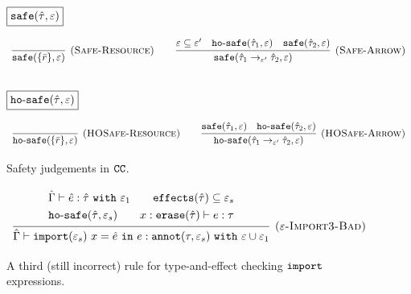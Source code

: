 \begin{figure}
\vspace*{-5mm}
\noindent
$\fbox{$\mathtt{safe}(\hat \tau, \varepsilon)$}$

\vspace{-2mm}
\[
\begin{array}{c}
\infer[\textsc{(Safe-Resource)}]
	{ \kwa{safe}(\{ \bar r \}, \varepsilon) }
	{} 
\hspace{5ex}
	
\infer[\textsc{(Safe-Arrow)}]
	{\kwa{safe}(\hat \tau_1 \rightarrow_{\varepsilon'} \hat \tau_2, \varepsilon)}
	{\varepsilon \subseteq \varepsilon' & \kwa{ho \hyphen safe}(\hat \tau_1, \varepsilon) & \kwa{safe}(\hat \tau_2, \varepsilon)} \\[3ex]

\end{array}
\]

\noindent
$\fbox{$\mathtt{ho \hbox{-} safe}(\hat \tau, \varepsilon)$}$

\vspace{-2mm}
\[
\begin{array}{c}
\infer[\textsc{(HOSafe-Resource)}]
	{ \kwa{ho \hyphen safe}( \{ \bar r \}, \varepsilon)} 
	{}
\hspace{5ex}

\infer[\textsc{(HOSafe-Arrow)}]
	{ \kwa{ho \hyphen safe}( \hat \tau_1 \rightarrow_{\varepsilon'} \hat \tau_2, \varepsilon ) }
	{ \kwa{safe}(\hat \tau_1, \varepsilon)  & \kwa{ho \hyphen safe}(\hat \tau_2, \varepsilon) }
\end{array}
\]
\caption{Safety judgements in $\mathtt{CC}$.}
\label{fig:safe_defns}
\end{figure}

\begin{figure}
\[
\begin{array}{c}
\infer[\textsc{($\varepsilon$-Import3-Bad)}]
	{ \hat \Gamma \vdash \kwa{import}(\varepsilon_s)~x = \hat e~\kw{in} e: \kwa{annot}(\tau, \varepsilon_s)~\kw{with} \varepsilon \cup \varepsilon_1 }
{{\def\arraystretch{1.4}
  \begin{array}{c}
\hat \Gamma \vdash \hat e: \hat \tau~\kw{with} \varepsilon_1
~~~~~~
\kwa{effects}(\hat \tau) \subseteq \varepsilon_s \\[-.5mm]
\hosafe{\hat \tau}{\varepsilon_s} ~~~~~~ x: \kwa{erase}(\hat \tau) \vdash e: \tau
  \end{array}}} 
\end{array}
\]
\vspace*{-5mm}
\caption{A third (still incorrect) rule for type-and-effect checking $\mathtt{import}$ expressions.}
\vspace*{-5mm}
\label{fig:import_rule3}
\end{figure}

